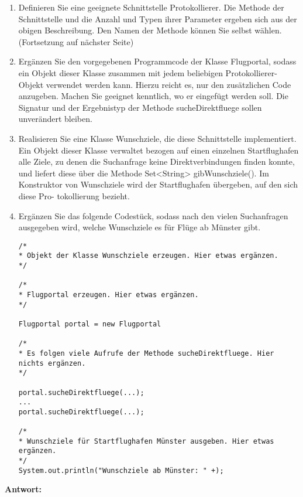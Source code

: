 \begin{enumerate}
    \item Definieren Sie eine geeignete Schnittstelle Protokollierer. Die Methode der
          Schnittstelle und die Anzahl und Typen ihrer Parameter ergeben sich aus der
          obigen Beschreibung. Den Namen der Methode können Sie selbst wählen.
          (Fortsetzung auf nächster Seite)
    \item Ergänzen Sie den vorgegebenen Programmcode der Klasse Flugportal, sodass ein
          Objekt dieser Klasse zusammen mit jedem beliebigen Protokollierer-Objekt
          verwendet werden kann. Hierzu reicht es, nur den zusätzlichen Code anzugeben.
          Machen Sie geeignet kenntlich, wo er eingefügt werden soll. Die Signatur und
          der Ergebnistyp der Methode sucheDirektfluege sollen unverändert bleiben.
    \item Realisieren Sie eine Klasse Wunschziele, die diese Schnittstelle implementiert.
          Ein Objekt dieser Klasse verwaltet bezogen auf einen einzelnen Startflughafen
          alle Ziele, zu denen die Suchanfrage keine Direktverbindungen finden konnte,
          und liefert diese über die Methode Set<String> gibWunschziele(). Im Konstruktor
          von Wunschziele wird der Startflughafen übergeben, auf den sich diese Pro-
          tokollierung bezieht.
    \item Ergänzen Sie das folgende Codestück, sodass nach den vielen Suchanfragen
          ausgegeben wird, welche Wunschziele es für Flüge ab Münster gibt.
          \begin{lstlisting}
/*
* Objekt der Klasse Wunschziele erzeugen. Hier etwas ergänzen.
*/

/*
* Flugportal erzeugen. Hier etwas ergänzen.
*/

Flugportal portal = new Flugportal

/*
* Es folgen viele Aufrufe der Methode sucheDirektfluege. Hier nichts ergänzen.
*/

portal.sucheDirektfluege(...);
...
portal.sucheDirektfluege(...);

/*
* Wunschziele für Startflughafen Münster ausgeben. Hier etwas ergänzen.
*/
System.out.println("Wunschziele ab Münster: " +);
\end{lstlisting}
\end{enumerate}

\textbf{Antwort:}

